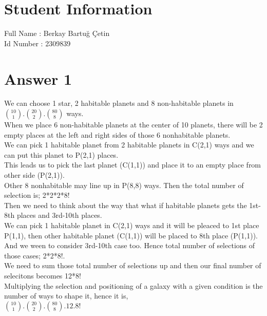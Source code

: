 \documentclass[11pt]{article}
\begin{document}
\section*{Student Information } 
Full Name : Berkay Bartuğ Çetin\\
Id Number : 2309839 \\

\section*{Answer 1}
We can choose 1 star, 2 habitable planets and 8 non-habitable planets in $\binom{10}{1}.\binom{20}{2}.\binom{80}{8}$ ways. \\
When we place 6 non-habitable planets at the center of 10 planets, there will be 2 empty places at the left and right sides of those 6 nonhabitable planets. \\
We can pick 1 habitable planet from 2 habitable planets in C(2,1) ways and we can put this planet to P(2,1) places. \\
This leads us to pick the last planet (C(1,1)) and place it to an empty place from other side (P(2,1)).\\
Other 8 nonhabitable may line up in P(8,8) ways. Then the total number of selection is; 2*2*2*8! \\
Then we need to think about the way that what if habitable planets gets the 1st-8th places and 3rd-10th places. \\
We can pick 1 habitable planet in C(2,1) ways and it will be pleaced to 1st place P(1,1), then other habitable planet (C(1,1)) will be placed to 8th place (P(1,1)). \\
And we ween to consider 3rd-10th case too. Hence total number of selections of those cases; 2*2*8!. \\
We need to sum those total number of selections up and then our final number of selecitons becomes 12*8! \\
Multiplying the selection and positioning of a galaxy with a given condition is the number of ways to shape it, hence it is, \\
$\binom{10}{1}.\binom{20}{2}.\binom{80}{8}.12.8!$ \\
\end{document}
